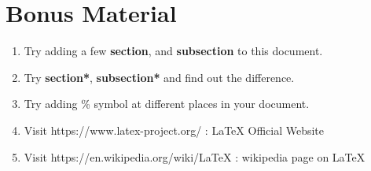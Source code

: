 \documentclass{article}
\begin{document}
\section*{Bonus Material}

\begin{enumerate}
	\item Try adding a few \textbf{section}, and \textbf{subsection} to this document.
	\item Try \textbf{section*}, \textbf{subsection*} and find out the difference.
	\item Try adding \% symbol at different places in your document.
	\item Visit https://www.latex-project.org/ : \LaTeX{} Official Website
	\item Visit https://en.wikipedia.org/wiki/LaTeX : wikipedia page on \LaTeX{}
\end{enumerate}

%
%
\end{document}
